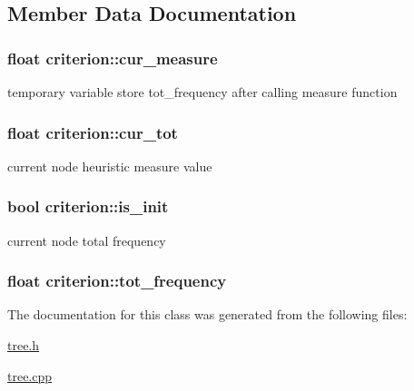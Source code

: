 \subsection{Member Data Documentation}
\hypertarget{classcriterion_af8e6efc16000b83cffb9e0864bf68561}{
\subsubsection[{cur\+\_\+measure}]{\setlength{\rightskip}{0pt plus 5cm}float criterion\+::cur\+\_\+measure\hspace{0.3cm}{\ttfamily [protected]}}}\label{classcriterion_af8e6efc16000b83cffb9e0864bf68561}
temporary variable store {\ttfamily tot\+\_\+frequency} after calling {\ttfamily measure} function \hypertarget{classcriterion_aa89bec3e37cd874b3590887038712c54}{
\subsubsection[{cur\+\_\+tot}]{\setlength{\rightskip}{0pt plus 5cm}float criterion\+::cur\+\_\+tot\hspace{0.3cm}{\ttfamily [protected]}}}\label{classcriterion_aa89bec3e37cd874b3590887038712c54}
current node heuristic measure value \hypertarget{classcriterion_a5f3c4708d9e6a9120ec8b8d98c73ff47}{
\subsubsection[{is\+\_\+init}]{\setlength{\rightskip}{0pt plus 5cm}bool criterion\+::is\+\_\+init\hspace{0.3cm}{\ttfamily [protected]}}}\label{classcriterion_a5f3c4708d9e6a9120ec8b8d98c73ff47}
current node total frequency \hypertarget{classcriterion_ac226599a3e6e160614d3698193053368}{
\subsubsection[{tot\+\_\+frequency}]{\setlength{\rightskip}{0pt plus 5cm}float criterion\+::tot\+\_\+frequency\hspace{0.3cm}{\ttfamily [protected]}}}\label{classcriterion_ac226599a3e6e160614d3698193053368}


The documentation for this class was generated from the following files\+:\begin{DoxyCompactItemize}
\item 
\hyperlink{tree_8h}{tree.\+h}\item 
\hyperlink{tree_8cpp}{tree.\+cpp}\end{DoxyCompactItemize}
